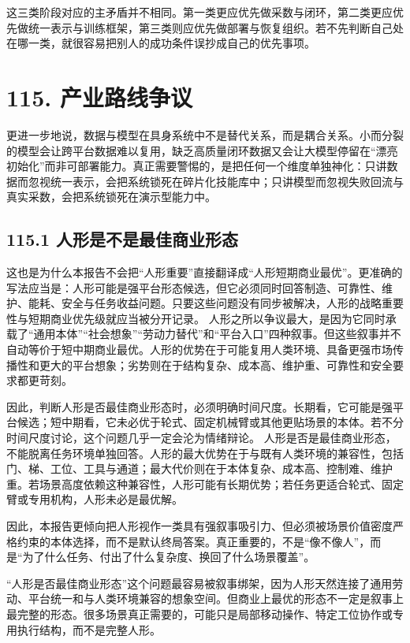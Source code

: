 这三类阶段对应的主矛盾并不相同。第一类更应优先做采数与闭环，第二类更应优先做统一表示与训练框架，第三类则应优先做部署与恢复组织。若不先判断自己处在哪一类，就很容易把别人的成功条件误抄成自己的优先事项。

\section*{115. 产业路线争议}

更进一步地说，数据与模型在具身系统中不是替代关系，而是耦合关系。小而分裂的模型会让跨平台数据难以复用，缺乏高质量闭环数据又会让大模型停留在“漂亮初始化”而非可部署能力。真正需要警惕的，是把任何一个维度单独神化：只讲数据而忽视统一表示，会把系统锁死在碎片化技能库中；只讲模型而忽视失败回流与真实采数，会把系统锁死在演示型能力中。

\subsection*{115.1 人形是不是最佳商业形态}


这也是为什么本报告不会把“人形重要”直接翻译成“人形短期商业最优”。更准确的写法应当是：人形可能是强平台形态候选，但它必须同时回答制造、可靠性、维护、能耗、安全与任务收益问题。只要这些问题没有同步被解决，人形的战略重要性与短期商业优先级就应当被分开记录。 人形之所以争议最大，是因为它同时承载了“通用本体”“社会想象”“劳动力替代”和“平台入口”四种叙事。但这些叙事并不自动等价于短中期商业最优。人形的优势在于可能复用人类环境、具备更强市场传播性和更大的平台想象；劣势则在于结构复杂、成本高、维护重、可靠性和安全要求都更苛刻。

因此，判断人形是否最佳商业形态时，必须明确时间尺度。长期看，它可能是强平台候选；短中期看，它未必优于轮式、固定机械臂或其他更贴场景的本体。若不分时间尺度讨论，这个问题几乎一定会沦为情绪辩论。 人形是否是最佳商业形态，不能脱离任务环境单独回答。人形的最大优势在于与既有人类环境的兼容性，包括门、梯、工位、工具与通道；最大代价则在于本体复杂、成本高、控制难、维护重。若场景高度依赖这种兼容性，人形可能有长期优势；若任务更适合轮式、固定臂或专用机构，人形未必是最优解。

因此，本报告更倾向把人形视作一类具有强叙事吸引力、但必须被场景价值密度严格约束的本体选择，而不是默认终局答案。真正重要的，不是“像不像人”，而是“为了什么任务、付出了什么复杂度、换回了什么场景覆盖”。

“人形是否最佳商业形态”这个问题最容易被叙事绑架，因为人形天然连接了通用劳动、平台统一和与人类环境兼容的想象空间。但商业上最优的形态不一定是叙事上最完整的形态。很多场景真正需要的，可能只是局部移动操作、特定工位协作或专用执行结构，而不是完整人形。

